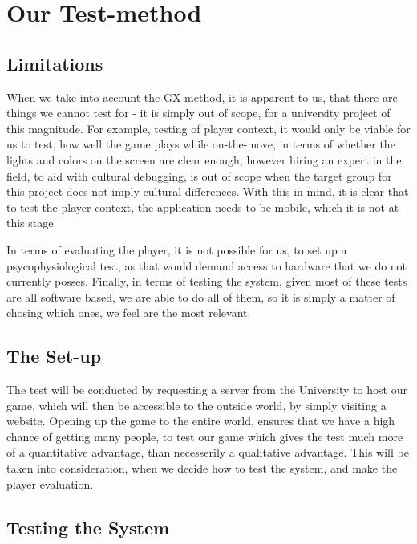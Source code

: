 \section{Our Test-method}
\label{sec:test_method}

\subsection{Limitations}

When we take into account the GX method, it is apparent to us, that there are things we cannot test for - it is simply out of scope, for a university 
project of this magnitude. For example, testing of player context, it would only be viable for us to test, how well the game plays while on-the-move, 
in terms of whether the lights and colors on the screen are clear enough, however hiring an expert in the field, to aid with cultural debugging, is out 
of scope when the target group for this project does not imply cultural differences. With this in mind, it is clear that to test the player context, 
the application needs to be mobile, which it is not at this stage.


In terms of evaluating the player, it is not possible for us, to set up a psycophysiological test, as that would demand access to hardware that we do 
not currently posses. Finally, in terms of testing the system, given most of these tests are all software based, we are able to do all of them, so it is simply a matter of chosing which ones, we feel are the most relevant.

\subsection{The Set-up}

The test will be conducted by requesting a server from the University to host our game, which will then be accessible to the outside world, by simply visiting a website. Opening up the game to the entire world, ensures that we have a high chance of getting many people, to test our game which gives the test much more of a quantitative advantage, than necesserily a qualitative advantage. This will be taken into consideration, when we decide how to test the system, and make the player evaluation.

\subsection{Testing the System}

